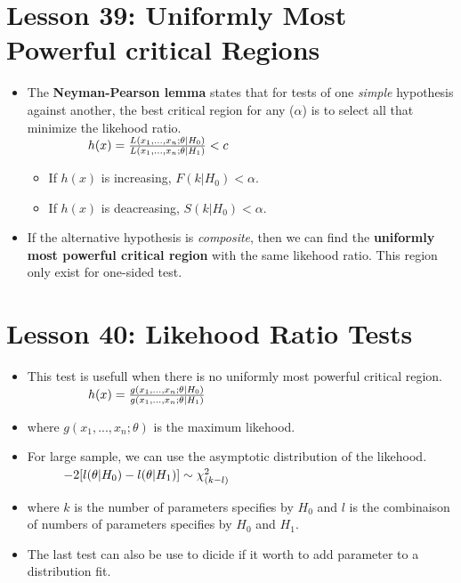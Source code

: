 \documentclass[10pt, french]{article}
\begin{document}
\begin{multicols*}{3}
\section*{Lesson 39: Uniformly Most Powerful critical Regions}
\begin{itemize}[align=left,leftmargin=*]
  \item The \textbf{Neyman-Pearson lemma} states that for tests of one \emph{simple} hypothesis against another, the best critical region for any ($\alpha$) is to select all that minimize the likehood ratio. \\
  $\hspace*{1.7cm} h(x) = \frac{L(x_1,...,x_n;\theta|H_0)}{L(x_1,...,x_n;\theta|H_1)} < c$
  \begin{itemize}
    \item If $h(x)$ is increasing, $F(k|H_0) < \alpha$.
    \item If $h(x)$ is deacreasing, $S(k|H_0) < \alpha$.
  \end{itemize}
  \item If the alternative hypothesis is \emph{composite}, then we can find the \textbf{uniformly most powerful critical region} with the same likehood ratio. This region only exist for one-sided test.
\end{itemize}

\section*{Lesson 40: Likehood Ratio Tests}
\begin{itemize}[align=left,leftmargin=*]
  \item This test is usefull when there is no uniformly most powerful critical region. \\
  $\hspace*{1.7cm} h(x) = \frac{g(x_1,...,x_n;\theta|H_0)}{g(x_1,...,x_n;\theta|H_1)}$
  \item[] where $g(x_1,...,x_n;\theta)$ is the maximum likehood.
  \item For large sample, we can use the asymptotic distribution of the likehood. \\
  $\hspace*{1cm} -2[l(\theta|H_0) - l(\theta|H_1)] \sim \chi_{(k - l)}^2$
  \item[] where $k$ is the number of parameters specifies by $H_0$ and $l$ is the combinaison of numbers of parameters specifies by $H_0$ and $H_1$.
  \item The last test can also be use to dicide if it worth to add parameter to a distribution fit.
\end{itemize}


\end{multicols*}
\end{document}

